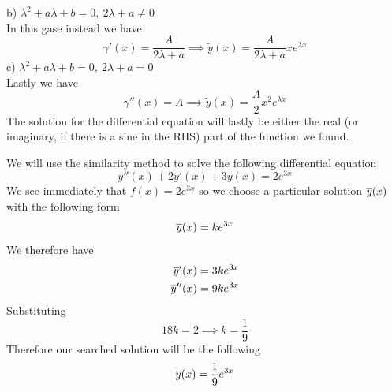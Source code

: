 \documentclass[../complete.tex]{subfiles}
\begin{document}
\begin{mtd}
	b) $\lambda^2+a\lambda+b=0,\ 2\lambda+a\ne0$\\
	In this gase instead we have
	\begin{equation*}
		\gamma'(x)=\frac{A}{2\lambda+a}\implies{} \tilde{y}(x)=\frac{A}{2\lambda+a}xe^{\lambda x}
	\end{equation*}
	c) $\lambda^2+a\lambda+b=0,\ 2\lambda+a=0$\\
	Lastly we have
	\begin{equation*}
		\gamma''(x)=A\implies{} \tilde{y}(x)=\frac{A}{2}x^2e^{\lambda x}
	\end{equation*}
	The solution for the differential equation will lastly be either the real (or imaginary, if there is a sine in the RHS) part of the function we found.
\end{mtd}
\begin{eg}
	We will use the similarity method to solve the following differential equation
	\begin{equation*}
		y''(x)+2y'(x)+3y(x)=2e^{3x}
	\end{equation*}
	We see immediately that $f(x)=2e^{3x}$ so we choose a particular solution $\overline{y}(x)$ with the following form
	\begin{equation*}
		\overline{y}(x)=ke^{3x}
	\end{equation*}
	We therefore have
	\begin{equation*}
		\begin{aligned}
			\overline{y}'(x)&=3ke^{3x}\\
			\overline{y}''(x)&=9ke^{3x}
		\end{aligned}
	\end{equation*}
	Substituting
	\begin{equation*}
		18k=2\implies{} k=\frac{1}{9}
	\end{equation*}
	Therefore our searched solution will be the following
	\begin{equation*}
		\overline{y}(x)=\frac{1}{9}e^{3x}
	\end{equation*}
\end{eg}
\end{document}
